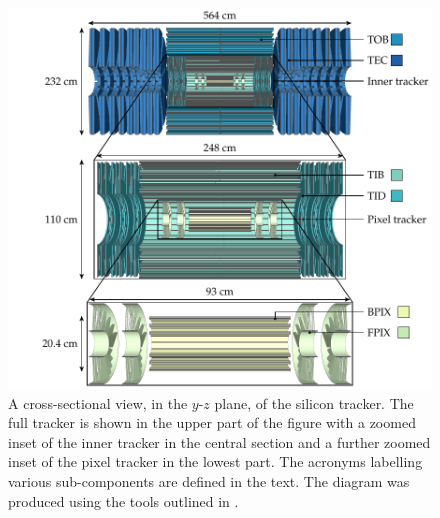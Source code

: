 \begin{figure}[htb]
    \centering
    \includegraphics{diagrams/tikz/cms/annotated/cms_tracker.pdf}
    \caption[Cross-section view of the silicon tracker.]{
        A cross-sectional view, in the $y$-$z$ plane, of the silicon tracker.  The full tracker is shown in the upper part of the figure with a zoomed inset of the inner tracker in the central section and a further zoomed inset of the pixel tracker in the lowest part. The acronyms labelling various sub-components are defined in the text. The diagram was produced using the tools outlined in \cite{Sakuma:2013jqa}.
    }
    \label{fig:cms-tracker}
\end{figure}

